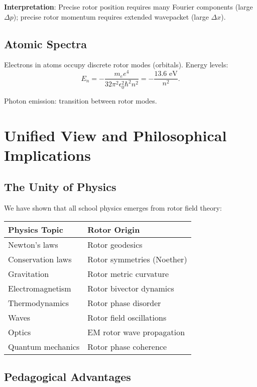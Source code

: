 \documentclass[12pt,a4paper]{article}
\theoremstyle{definition}
\theoremstyle{remark}
\begin{document}
\textbf{Interpretation}: Precise rotor position requires many Fourier components (large $\Delta p$); precise rotor momentum requires extended wavepacket (large $\Delta x$).

\subsection{Atomic Spectra}

Electrons in atoms occupy discrete rotor modes (orbitals). Energy levels:
\begin{equation}
E_n = -\frac{m_e e^4}{32\pi^2 \epsilon_0^2 \hbar^2 n^2} = -\frac{13.6 \text{ eV}}{n^2}.
\end{equation}

Photon emission: transition between rotor modes.

\section{Unified View and Philosophical Implications}

\subsection{The Unity of Physics}

We have shown that all school physics emerges from rotor field theory:

\begin{center}
\begin{tabular}{|l|l|}
\hline
\textbf{Physics Topic} & \textbf{Rotor Origin} \\
\hline
Newton's laws & Rotor geodesics \\
Conservation laws & Rotor symmetries (Noether) \\
Gravitation & Rotor metric curvature \\
Electromagnetism & Rotor bivector dynamics \\
Thermodynamics & Rotor phase disorder \\
Waves & Rotor field oscillations \\
Optics & EM rotor wave propagation \\
Quantum mechanics & Rotor phase coherence \\
\hline
\end{tabular}
\end{center}

\subsection{Pedagogical Advantages}
\end{document}
